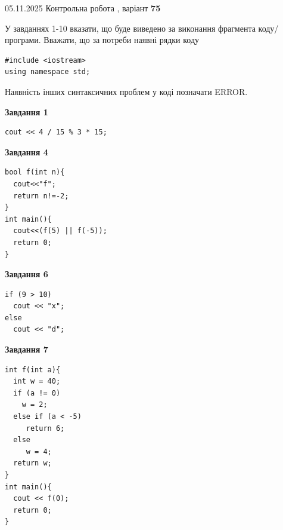 \documentclass[12pt, ukrainian]{article}
\begin{document}
{\Large{05.11.2025 Контрольна робота , варіант  \No \textbf { 75 }\par}}
{
\begin {large}
У завданнях 1-10 вказати, що буде виведено за виконання фрагмента коду/про\-гра\-ми.
Вважати, що за потреби наявні рядки коду
\begin{verbatim}
#include <iostream>
using namespace std;
\end{verbatim}
Наявність інших синтаксичних проблем у коді позначати ERROR.

\begin{minipage}[t]{7.0cm}

\begin{center}
\textbf{Завдання 1}
\end{center}
\vspace{-8mm}

\begin{verbatim}
cout << 4 / 15 % 3 * 15;
\end{verbatim}



\begin{center}
\textbf{Завдання 4}
\end{center}
\vspace{-8mm}

\begin{verbatim}
bool f(int n){
  cout<<"f";
  return n!=-2;
}
int main(){
  cout<<(f(5) || f(-5));
  return 0;
}
\end{verbatim}



\begin{center}
\textbf{Завдання 6}
\end{center}
\vspace{-8mm}

\begin{verbatim}
if (9 > 10)
  cout << "x";
else
  cout << "d";
\end{verbatim}



\begin{center}
\textbf{Завдання 7}
\end{center}
\vspace{-8mm}

\begin{verbatim}
int f(int a){
  int w = 40;
  if (a != 0)
    w = 2;
  else if (a < -5)
     return 6;
  else
     w = 4;
  return w;
}
int main(){
  cout << f(0);
  return 0;
}
\end{verbatim}


\end{minipage}
\end{large}}
\end{document}
